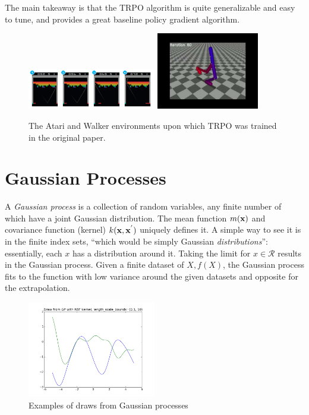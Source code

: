 \documentclass[12pt]{article}
\theoremstyle{plain}
\begin{document}
The main takeaway is that the TRPO algorithm is quite generalizable and easy to tune, and provides a great baseline policy gradient algorithm.

\begin{figure}[h]
  \centering
  \includegraphics[width=0.5\textwidth]{atari.png}
  \includegraphics[width=0.4\textwidth]{walker.jpg}
  \caption{The Atari and Walker environments upon which TRPO was trained in the original paper.}
\end{figure}

\section{Gaussian Processes}

A \textit{Gaussian process} is a collection of random variables, any finite number of which have a joint Gaussian distribution. The mean function $m(\bold{x})$ and covariance function (kernel) $k(\bold{x}, \bold{x}^{'} )$ uniquely defines it. A simple way to see it is in the finite index sets, ``which would be simply Gaussian \textit{distributions}'': essentially, each $x$ has a distribution around it. Taking the limit for $x \in \mathcal{R}$ results in the Gaussian process. Given a finite dataset of $X, f(X)$, the Gaussian process fits to the function with low variance around the given datasets and opposite for the extrapolation.

\begin{figure}[h]
  \centering
  \includegraphics[width=0.5\textwidth]{gp1.png}

  \caption{Examples of draws from Gaussian processes}
\end{figure}
\end{document}
